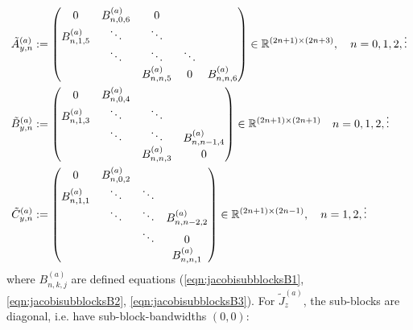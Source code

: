 \documentclass[11pt, oneside]{article}   	%
\begin{document}
\begin{align*}
	\tilde A^{(a)}_{y,n} &:= 
		\begin{pmatrix}
			0 & B^{(a)}_{n,0,6} & 0 & & \\
			B^{(a)}_{n,1,5} & \ddots & \ddots & & \\
			& \ddots & \ddots & \ddots & \\
			& & B^{(a)}_{n,n,5} & 0 & B^{(a)}_{n,n,6} \\
		\end{pmatrix} \in \mathbb{R}^{(2n+1)\times(2n+3)}, \quad n = 0,1,2,\vdots \\
	\tilde B^{(a)}_{y,n} &:= 
		\begin{pmatrix}
			0 & B^{(a)}_{n,0,4} & & \\
			B^{(a)}_{n,1,3} & \ddots & \ddots & \\
			& \ddots & \ddots & B^{(a)}_{n,n-1,4} \\
			& & B^{(a)}_{n,n,3} & 0
		\end{pmatrix} \in \mathbb{R}^{(2n+1)\times(2n+1)}  \quad n = 0,1,2,\vdots \\
	\tilde C^{(a)}_{y,n} &:= 
		\begin{pmatrix}
			0 & B^{(a)}_{n,0,2} & & \\
			B^{(a)}_{n,1,1} & \ddots & \ddots & \\
			& \ddots & \ddots & B^{(a)}_{n,n-2,2} \\
			& & \ddots & 0 \\
			& & & B^{(a)}_{n,n,1} \\
		\end{pmatrix} \in \mathbb{R}^{(2n+1)\times(2n-1)}, \quad n = 1,2,\vdots
\end{align*}
where $B^{(a)}_{n,k,j}$ are defined equations (\ref{eqn:jacobisubblocksB1}, \ref{eqn:jacobisubblocksB2}, \ref{eqn:jacobisubblocksB3}). For $\tilde J_z^{(a)}$, the sub-blocks are diagonal, i.e. have sub-block-bandwidths $(0,0)$:
\end{document}

